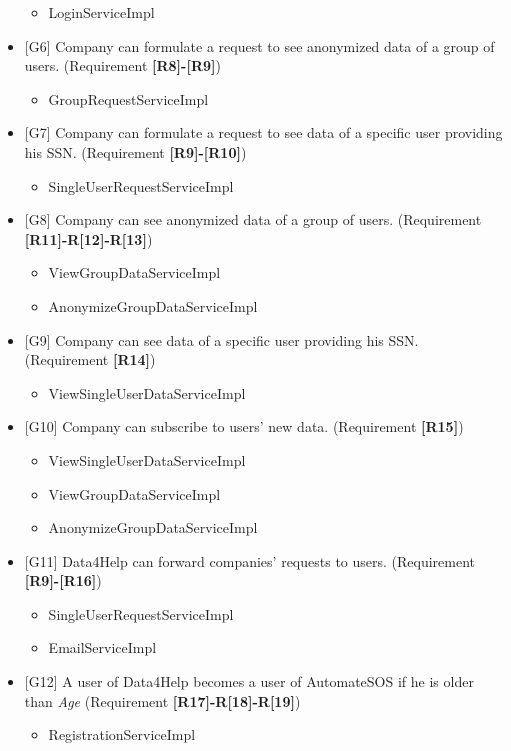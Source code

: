 \documentclass{article}
\begin{document}
\begin{itemize}
\begin{itemize}
	\item LoginServiceImpl
	\end{itemize}
	\item {[G6]} Company can formulate a request to see anonymized data of a group of users. (Requirement \textbf{[R8]-[R9]})
	\begin{itemize}
	\item GroupRequestServiceImpl
	\end{itemize}
	\item {[G7]} Company can formulate a request to see data of a specific user providing his SSN. (Requirement \textbf{[R9]-[R10]})
	\begin{itemize}
	\item SingleUserRequestServiceImpl
	\end{itemize}
	\item {[G8]} Company can see anonymized data of a group of users. (Requirement \textbf{[R11]-R[12]-R[13]})
	\begin{itemize}
	\item ViewGroupDataServiceImpl
	\item AnonymizeGroupDataServiceImpl
	\end{itemize}
	\item {[G9]} Company can see data of a specific user providing his SSN. (Requirement \textbf{[R14]})
	\begin{itemize}
	\item ViewSingleUserDataServiceImpl
	\end{itemize}
	\item {[G10]} Company can subscribe to users' new data. (Requirement \textbf{[R15]})
	\begin{itemize}
	\item ViewSingleUserDataServiceImpl	
	\item ViewGroupDataServiceImpl
	\item AnonymizeGroupDataServiceImpl
	\end{itemize}
	\item {[G11]} Data4Help can forward companies' requests to users. (Requirement \textbf{[R9]-[R16]})
	\begin{itemize}
	\item SingleUserRequestServiceImpl
	\item EmailServiceImpl
	\end{itemize}
	\item {[G12]} A user of Data4Help becomes a user of AutomateSOS if he is older than \emph{Age} (Requirement \textbf{[R17]-R[18]-R[19]})
	\begin{itemize}
	\item RegistrationServiceImpl
	\end{itemize}
\end{itemize}
\newpage
\end{document}
